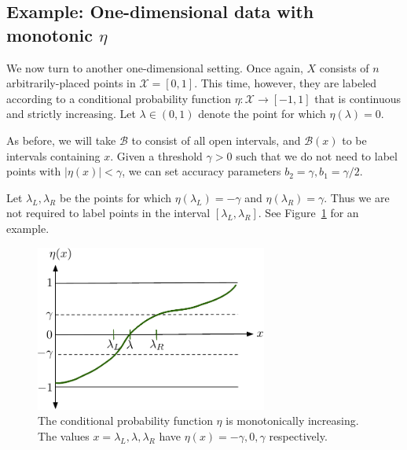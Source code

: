 \documentclass{article}
\def\X{{\mathcal X}}
\def\B{{\mathcal B}}
\begin{document}
\subsection{Example: One-dimensional data with monotonic $\eta$}

We now turn to another one-dimensional setting. Once again, $X$ consists of $n$ arbitrarily-placed points in $\X = [0,1]$. This time, however, they are labeled according to a conditional probability function $\eta: \X \to [-1,1]$ that is continuous and strictly increasing. Let $\lambda \in (0,1)$ denote the point for which $\eta(\lambda) = 0$.

As before, we will take $\B$ to consist of all open intervals, and $\B(x)$ to be intervals containing $x$. Given a threshold $\gamma > 0$ such that we do not need to label points with $|\eta(x)| < \gamma$, we can set accuracy parameters $b_2 = \gamma, b_1 = \gamma/2$.

Let $\lambda_L, \lambda_R$ be the points for which $\eta(\lambda_L) = -\gamma$ and $\eta(\lambda_R) = \gamma$. Thus we are not required to label points in the interval $[\lambda_L, \lambda_R]$. See Figure~\ref{fig:oned-monotonic} for an example.

\begin{figure}
\begin{center}
\includegraphics[width=3in]{oned-monotonic.pdf}
\end{center}
\caption{The conditional probability function $\eta$ is monotonically increasing. The values $x = \lambda_L, \lambda, \lambda_R$ have $\eta(x) = -\gamma, 0, \gamma$ respectively.}
\label{fig:oned-monotonic}
\end{figure}
\end{document}
